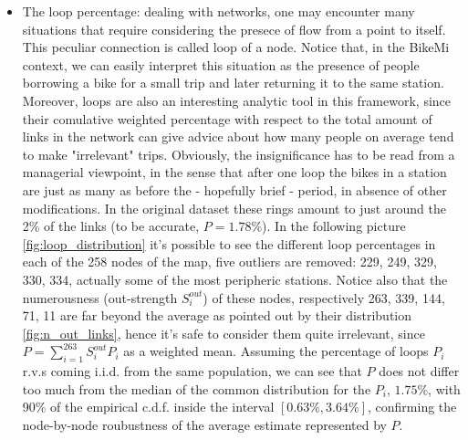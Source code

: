 \documentclass[11pt,twoside]{report}
\begin{document}
\begin{itemize}
	\item The loop percentage: dealing with networks, one may encounter many situations that require considering the presece of flow from a point to itself. This peculiar connection is called loop of a node. Notice that, in the BikeMi context, we can easily interpret this situation as the presence of people borrowing a bike for a small trip and later returning it to the same station. Moreover, loops are also an interesting analytic tool in this framework, since their comulative weighted percentage with respect to the total amount of links in the network can give advice about how many people on average tend to make "irrelevant" trips. Obviously, the insignificance has to be read from a managerial viewpoint, in the sense that after one loop the bikes in a station are just as many as before the - hopefully brief - period, in absence of other modifications. In the original dataset these rings amount to just around the 2\% of the links (to be accurate, $ P=1.78\% $).
	In the following picture \ref{fig:loop_distribution} it's possible to see the different loop percentages in each of the 258 nodes of the map, five outliers are removed: 229, 249, 329, 330, 334, actually some of the most peripheric stations. Notice also that the numerousness (out-strength $ S^{out}_i $) of these nodes, respectively 263, 339, 144, 71, 11 are far beyond the average as pointed out by their distribution \ref{fig:n_out_links}, hence it's safe to consider them quite irrelevant, since $ P = \sum_{i=1}^{263}S^{out}_iP_i $ as a weighted mean. Assuming the percentage of loops $ P_i $ r.v.s coming i.i.d. from the same population, we can see that $ P $ does not differ too much from the median of the common distribution for the $ P_i $, $ 1.75\% $, with 90\% of the empirical c.d.f. inside the interval $[0.63\%, 3.64\%]$, confirming the node-by-node roubustness of the average estimate represented by $ P $.\\
	\\

\end{itemize}
\end{document}
